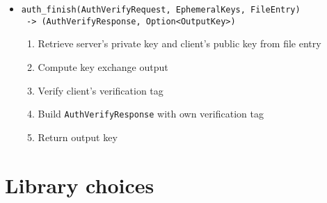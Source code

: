 \documentclass[../report.tex]{subfiles}
\begin{document}
\begin{itemize}
 \item \verb|auth_finish(AuthVerifyRequest, EphemeralKeys, FileEntry)|\\ 
       \verb| -> (AuthVerifyResponse, Option<OutputKey>)|
  \begin{enumerate}
    \item Retrieve server's private key and client's public key from file entry
    \item Compute key exchange output
    \item Verify client's verification tag
    \item Build \verb|AuthVerifyResponse| with own verification tag
    \item Return output key
  \end{enumerate}
  
\end{itemize}


% 
% 
% 
% 
% 
% 
% 
% 
% 
% 
% 
% 



\section{Library choices}
\end{document}
